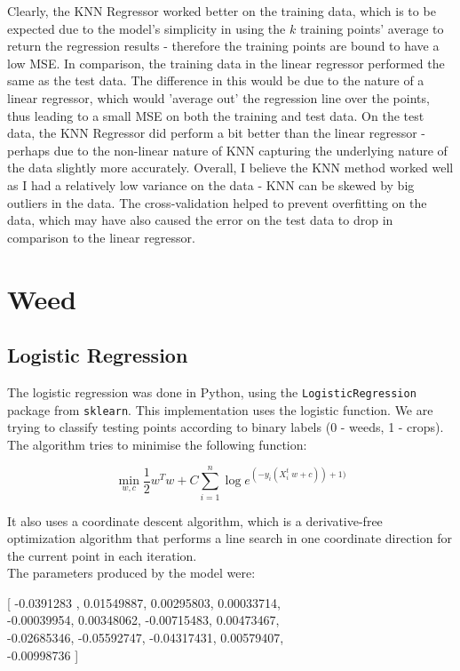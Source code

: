 \documentclass{scrartcl}
\begin{document}
Clearly, the KNN Regressor worked better on the training data, which is to be expected due to the model's simplicity in using the $k$ training points' average to return the regression results - therefore the training points are bound to have a low MSE. In comparison, the training data in the linear regressor performed the same as the test data. The difference in this would be due to the nature of a linear regressor, which would 'average out' the regression line over the points, thus leading to a small MSE on both the training and test data. On the test data, the KNN Regressor did perform a bit better than the linear regressor - perhaps due to the non-linear nature of KNN capturing the underlying nature of the data slightly more accurately. Overall, I believe the KNN method worked well as I had a relatively low variance on the data - KNN can be skewed by big outliers in the data. The cross-validation helped to prevent overfitting on the data, which may have also caused the error on the test data to drop in comparison to the linear regressor.

\newpage
\section{Weed}

\subsection{Logistic Regression}
The logistic regression was done in Python, using the \texttt{LogisticRegression} package from \texttt{sklearn}. This implementation uses the logistic function. We are trying to classify testing points according to binary labels (0 - weeds, 1 - crops). The algorithm tries to minimise the following function:

\[ \min_{w, c} \frac{1} {2} w^T w + C \sum^n_{i=1} \log e ^{(-y_i(X^t_i \; w + c)) +1)} \]

It also uses a coordinate descent algorithm, which is a derivative-free optimization algorithm that performs a line search in one coordinate direction for the current point in each iteration. \cite{wiki:cd} \\

The parameters produced by the model were:

\begin{center}
[  -0.0391283 ,  0.01549887,  0.00295803,  0.00033714, \\
   -0.00039954,  0.00348062, -0.00715483,  0.00473467, \\
   -0.02685346, -0.05592747, -0.04317431,  0.00579407, \\
  -0.00998736
]
\end{center}
\end{document}
